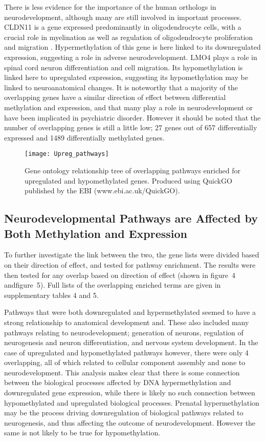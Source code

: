 \documentclass{bioinfo}
\begin{document}
\begin{results}
There is less evidence for the importance of the human orthologs in neurodevelopment, although many are still involved in important processes. CLDN11 is a gene expressed predominantly in oligodendrocyte cells, with a crucial role in myelination as well as regulation of oligodendrocyte proliferation and migration \citep{tiwari-woodruff_ospclaudin-11_2001}. Hypermethylation of this gene is here linked to its downregulated expression, suggesting a role in adverse neurodevelopment. LMO4 plays a role in spinal cord neuron differentiation and cell migration. Its hypomethylation is linked here to upregulated expression, suggesting its hypomethylation may be linked to neuroanatomical changes. It is noteworthy that a majority of the overlapping genes have a similar direction of effect between differential methylation and expression, and that many play a role in neurodevelopment or have been implicated in psychiatric disorder. However it should be noted that the number of overlapping genes is still a little low; 27 genes out of 657 differentially expressed and 1489 differentially methylated genes.

\begin{figure}[!htb]
\centerline{\texttt{[image: Upreg\_pathways]}}
\caption{Gene ontology relationship tree of overlapping pathways enriched for upregulated and hypomethylated genes. Produced using QuickGO published by the EBI \citep{binns_quickgo_2009} (www.ebi.ac.uk/QuickGO).}\label{fig:05}
\end{figure}

\subsection{Neurodevelopmental Pathways are Affected by Both Methylation and Expression}
To further investigate the link between the two, the gene lists were divided based on their direction of effect, and tested for pathway enrichment. The results were then tested for any overlap based on direction of effect (shown in figure~4\vphantom{\ref{fig:04}} andfigure~5\vphantom{\ref{fig:05}}). Full lists of the overlapping enriched terms are given in supplementary tables 4 and 5. 

Pathways that were both downregulated and hypermethylated seemed to have a strong relationship to anatomical development and. These also included many pathways relating to neurodevelopment; generation of neurons, regulation of neurogenesis and neuron differentiation, and nervous system development. In the case of upregulated and hypomethylated pathways however, there were only 4 overlapping, all of which related to cellular component assembly and none to neurodevelopment. This analysis makes clear that there is some connection between the biological processes affected by DNA hypermethylation and downregulated gene expression, while there is likely no such connection between hypomethylated and upregulated biological processes. Prenatal hypermethylation may be the process driving downregulation of biological pathways related to neurogenesis, and thus affecting the outcome of neurodevelopment. However the same is not likely to be true for hypomethylation.



\end{results}
\end{document}
